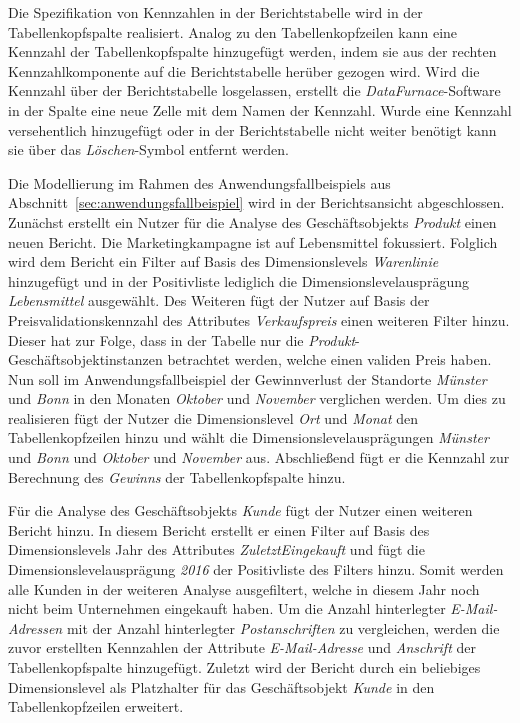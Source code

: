 \documentclass[
  language=german, %
  type=bachelor%
]{isthesis}
\begin{document}
\begin{content}
  Die Spezifikation von Kennzahlen in der Berichtstabelle wird in der
  Tabellenkopfspalte realisiert. Analog zu den Tabellenkopfzeilen kann eine
  Kennzahl der Tabellenkopfspalte hinzugefügt werden, indem sie aus der rechten
  Kennzahlkomponente auf die Berichtstabelle herüber gezogen wird. Wird die
  Kennzahl über der Berichtstabelle losgelassen, erstellt die
  \textit{DataFurnace}-Software in der Spalte eine neue Zelle mit dem Namen der
  Kennzahl. Wurde eine Kennzahl versehentlich hinzugefügt oder in der
  Berichtstabelle nicht weiter benötigt kann sie über das
  \textit{Löschen}-Symbol entfernt werden.

  Die Modellierung im Rahmen des Anwendungsfallbeispiels aus
  Abschnitt~\ref{sec:anwendungsfallbeispiel} wird in der Berichtsansicht
  abgeschlossen. Zunächst erstellt ein Nutzer für die Analyse des
  Geschäftsobjekts \textit{Produkt} einen neuen Bericht. Die Marketingkampagne
  ist auf Lebensmittel fokussiert. Folglich wird dem Bericht ein Filter auf
  Basis des Dimensionslevels \textit{Warenlinie} hinzugefügt und in der
  Positivliste lediglich die Dimensionslevelausprägung \textit{Lebensmittel}
  ausgewählt. Des Weiteren fügt der Nutzer auf Basis der
  Preisvalidationskennzahl des Attributes \textit{Verkaufspreis} einen weiteren
  Filter hinzu. Dieser hat zur Folge, dass in der Tabelle nur die
  \textit{Produkt}-Geschäftsobjektinstanzen betrachtet werden, welche einen
  validen Preis haben. Nun soll im Anwendungsfallbeispiel der Gewinnverlust der
  Standorte \textit{Münster} und \textit{Bonn} in den Monaten \textit{Oktober}
  und \textit{November} verglichen werden. Um dies zu realisieren fügt der
  Nutzer die Dimensionslevel \textit{Ort} und \textit{Monat} den
  Tabellenkopfzeilen hinzu und wählt die Dimensionslevelausprägungen
  \textit{Münster} und \textit{Bonn} und \textit{Oktober} und \textit{November}
  aus. Abschließend fügt er die Kennzahl zur Berechnung des \textit{Gewinns}
  der Tabellenkopfspalte hinzu.  

  Für die Analyse des Geschäftsobjekts \textit{Kunde} fügt der Nutzer einen
  weiteren Bericht hinzu. In diesem Bericht erstellt er einen Filter auf Basis
  des Dimensionslevels Jahr des Attributes \textit{ZuletztEingekauft} und fügt
  die Dimensionslevelausprägung \textit{2016} der Positivliste des Filters
  hinzu. Somit werden alle Kunden in der weiteren Analyse ausgefiltert, welche
  in diesem Jahr noch nicht beim Unternehmen eingekauft haben. Um die Anzahl
  hinterlegter \textit{E-Mail-Adressen} mit der Anzahl hinterlegter
  \textit{Postanschriften} zu vergleichen, werden die zuvor erstellten
  Kennzahlen der Attribute \textit{E-Mail-Adresse} und \textit{Anschrift} der
  Tabellenkopfspalte hinzugefügt. Zuletzt wird der Bericht durch ein beliebiges
  Dimensionslevel als Platzhalter für das Geschäftsobjekt \textit{Kunde} in den
  Tabellenkopfzeilen erweitert.



\end{content}
\end{document}
